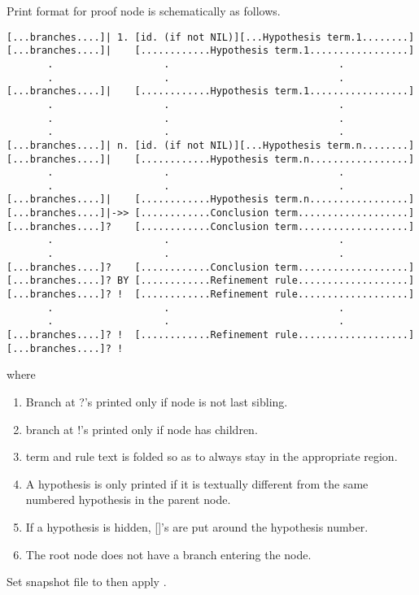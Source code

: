 Print format for proof node is schematically as follows.
\begin{verbatim}
[...branches....]| 1. [id. (if not NIL)][...Hypothesis term.1........]
[...branches....]|    [............Hypothesis term.1.................]
       .                   .                             .
       .                   .                             .
[...branches....]|    [............Hypothesis term.1.................]
       .                   .                             .
       .                   .                             .
       .                   .                             .
[...branches....]| n. [id. (if not NIL)][...Hypothesis term.n........]
[...branches....]|    [............Hypothesis term.n.................]
       .                   .                             .
       .                   .                             .
[...branches....]|    [............Hypothesis term.n.................]
[...branches....]|->> [............Conclusion term...................]
[...branches....]?    [............Conclusion term...................]
       .                   .                             .
       .                   .                             .
[...branches....]?    [............Conclusion term...................]
[...branches....]? BY [............Refinement rule...................]
[...branches....]? !  [............Refinement rule...................]
       .                   .                             .
       .                   .                             .
[...branches....]? !  [............Refinement rule...................]
[...branches....]? !  
\end{verbatim}
where
\begin{enumerate}
\item Branch at ?'s printed only if node is not last sibling.
\item branch at !'s printed only if node has children.
\item term and rule text is folded so as to always stay in the appropriate
   region. 
\item A hypothesis is only printed if it is textually different from the
   same numbered hypothesis in the parent node.
\item If a hypothesis is hidden, []'s are put around the hypothesis number.
\item The root node does not have a branch entering the node.
\end{enumerate}

 Set snapshot file to 
then apply  .

